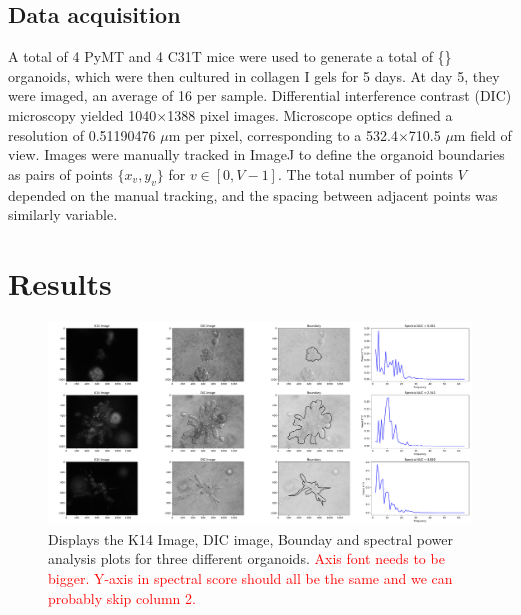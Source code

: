 \documentclass[10pt,letterpaper]{article}
\begin{document}
\subsection*{Data acquisition}

 A total of 4 PyMT and 4 C31T mice were used to generate a total of \{\} organoids, which were then cultured in collagen I gels for 5 days. At day 5, they were imaged, an average of 16 per sample. Differential interference contrast (DIC) microscopy yielded 1040$\times$1388 pixel images. Microscope optics defined a resolution of 0.51190476 $\mu$m per pixel, corresponding to a 532.4$\times$710.5 $\mu$m field of view. Images were manually tracked in {\sc ImageJ} \cite{Schneider:2012ui} to define the organoid boundaries as pairs of points $\{x_v,y_v\}$ for $v \in [0,V-1]$. The total number of points $V$ depended on the manual tracking, and the spacing between adjacent points was similarly variable.




\section*{Results}

\begin{figure}[!h]
\includegraphics[width=\textwidth]{Image1.pdf}
\caption{Displays the K14 Image, DIC image, Bounday and spectral power analysis plots for three different organoids. \textcolor{red}{Axis font needs to be bigger. Y-axis in spectral score should all be the same and we can probably skip column 2.}} 
\label{fig1}
\end{figure}
\end{document}
